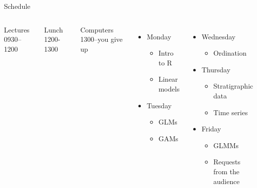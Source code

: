 \documentclass[10pt,ignorenonframetext,compress, aspectratio=169]{beamer}
\providecommand{\tightlist}{%
  \setlength{\itemsep}{0pt}\setlength{\parskip}{0pt}}
\newcommand{\columnsbegin}{\begin{columns}}
\newcommand{\columnsend}{\end{columns}}
\begin{document}
\begin{frame}{Schedule}

\columnsbegin


Lectures 0930--1200

Lunch 1200-1300

Computers 1300--you give up

\begin{itemize}
\tightlist
\item
  Monday

  \begin{itemize}
  \tightlist
  \item
    Intro to R
  \item
    Linear models
  \end{itemize}
\item
  Tuesday

  \begin{itemize}
  \tightlist
  \item
    GLMs
  \item
    GAMs
  \end{itemize}
\end{itemize}


\begin{itemize}
\tightlist
\item
  Wednesday

  \begin{itemize}
  \tightlist
  \item
    Ordination
  \end{itemize}
\item
  Thursday

  \begin{itemize}
  \tightlist
  \item
    Stratigraphic data
  \item
    Time series
  \end{itemize}
\item
  Friday

  \begin{itemize}
  \tightlist
  \item
    GLMMs
  \item
    Requests from the audience
  \end{itemize}
\end{itemize}

\columnsend

\end{frame}
\end{document}
